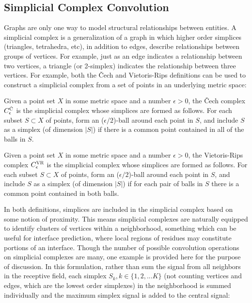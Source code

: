 \subsection{Simplicial Complex Convolution}

Graphs are only one way to model structural relationships between entities.
A simplicial complex is a generalization of a graph in which higher order simplices (triangles, tetrahedra, etc), in addition to edges, describe relationships between groups of vertices. 
For example, just as an edge indicates a relationship between two vertices, a triangle (or 2-simplex) indicates the relationship between three vertices.
For example, both the \v{C}ech and Vietoris-Rips definitions can be used to construct a simplicial complex from a set of points in an underlying metric space:

\begin{definition}
	Given a point set $X$ in some metric space and a number $\epsilon>0$, the \v{C}ech complex $C^{\textsc{\v{C}}}_\epsilon$ is the simplicial complex whose simplices are formed as follows. For each subset $S \subset X$ of points, form an ($\epsilon/2$)-ball around each point in $S$, and include $S$ as a simplex (of dimension $|S|$) if there is a common point contained in all of the balls in $S$.
\end{definition}

\begin{definition}
	Given a point set $X$ in some metric space and a number $\epsilon>0$, the Vietoris-Rips complex $C^{\textsc{VR}}_\epsilon$ is the simplicial complex whose simplices are formed as follows. For each subset $S \subset X$ of points, form an ($\epsilon/2$)-ball around each point in $S$, and include $S$ as a simplex (of dimension $|S|$) if for each pair of balls in $S$ there is a common point contained in both balls.
\end{definition}

In both definitions, simplices are included in the simplicial complex based on some notion of proximity.
This means simplicial complexes are naturally equipped to identify clusters of vertices within a neighborhood, something which can be useful for interface prediction, where local regions of residues may constitute portions of an interface.
Though the number of possible convolution operations on simplicial complexes are many, one example is provided here for the purpose of discussion. 
In this formulation, rather than sum the signal from all neighbors in the receptive field, each simplex $S_k, k \in \{1, 2,... K\}$ (not counting vertices and edges, which are the lowest order simplexes) in the neighborhood is summed individually and the maximum simplex signal is added to the central signal:

